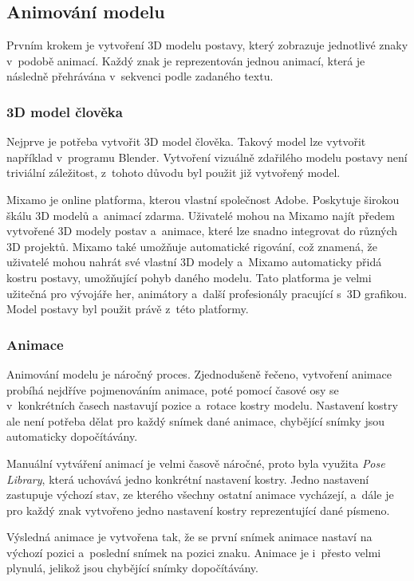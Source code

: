 \documentclass[
  master,
  program=ainfvs,
  biblatex,
  figures=true,
  tables=false,
  sourcecodes=true,
  glossaries,
  index
]{kidiplom}
\begin{document}
      
    \subsection{Animování modelu}
        Prvním krokem je vytvoření 3D modelu postavy, který zobrazuje jednotlivé znaky v~podobě animací. Každý znak je reprezentován jednou animací, která je následně přehrávána v~sekvenci podle zadaného textu.

        \subsubsection{3D model člověka}
            Nejprve je potřeba vytvořit 3D model člověka. Takový model lze vytvořit například v~programu Blender. Vytvoření vizuálně zdařilého modelu postavy není triviální záležitost, z~tohoto důvodu byl použit již vytvořený model.

            Mixamo \cite{mixamo} je online platforma, kterou vlastní společnost Adobe. Poskytuje širokou škálu 3D modelů a~animací zdarma. Uživatelé mohou na Mixamo najít předem vytvořené 3D modely postav a~animace, které lze snadno integrovat do různých 3D projektů. Mixamo také umožňuje automatické rigování, což znamená, že uživatelé mohou nahrát své vlastní 3D modely a~Mixamo automaticky přidá kostru postavy, umožňující pohyb daného modelu. Tato platforma je velmi užitečná pro vývojáře her, animátory a~další profesionály pracující s~3D grafikou. Model postavy byl použit právě z~této platformy. 
            
    
        \subsubsection{Animace}
            Animování modelu je náročný proces. Zjednodušeně řečeno, vytvoření animace probíhá nejdříve pojmenováním animace, poté pomocí časové osy se v~konkrétních časech nastavují pozice a~rotace kostry modelu. Nastavení kostry ale není potřeba dělat pro každý snímek dané animace, chybějící snímky jsou automaticky dopočítávány.

            Manuální vytváření animací je velmi časově náročné, proto byla využita \emph{Pose Library}, která uchovává jedno konkrétní nastavení kostry. Jedno nastavení zastupuje výchozí stav, ze kterého všechny ostatní animace vycházejí, a~dále je pro každý znak vytvořeno jedno nastavení kostry reprezentující dané písmeno. 
            
            Výsledná animace je vytvořena tak, že se první snímek animace nastaví na výchozí pozici a~poslední snímek na pozici znaku. Animace je i~přesto velmi plynulá, jelikož jsou chybějící snímky dopočítávány. 
            
\end{document}
